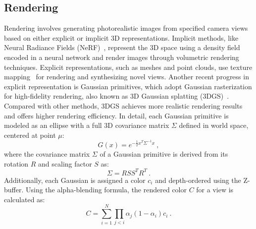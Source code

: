 \subsection{Rendering}
Rendering involves generating photorealistic images from specified camera views based on either explicit or implicit 3D representations. 
Implicit methods, like Neural Radiance Fields (NeRF)~\citep{mildenhall2021nerf}, represent the 3D space using a density field encoded in a neural network and render images through volumetric rendering techniques. 
Explicit representations, such as meshes and point clouds, use texture mapping~\cite{Blinn1976Texture} for rendering and synthesizing novel views. Another recent progress in explicit representation is Gaussian primitives, which adopt Gaussian rasterization for high-fidelity rendering, also known as 3D Gaussian splatting (3DGS)~\citep{kerbl3Dgaussians}.
Compared with other methods, 3DGS achieves more realistic rendering results and offers higher rendering efficiency.
In detail, each Gaussian primitive is modeled as an ellipse with a full 3D covariance matrix $\Sigma$ defined in world space, centered at point $\mu$:
\begin{equation*}
    G(x) = e^{-\frac{1}{2} x^T \Sigma^{-1} x}~,
\end{equation*}
where the covariance matrix $\Sigma$ of a Gaussian primitive is derived from its rotation $R$ and scaling factor $S$ as:
\begin{equation*}
    \Sigma = R S S^T R^T~.
\end{equation*}
Additionally, each Gaussian is assigned a color \( c_i \) and depth-ordered using the Z-buffer. Using the alpha-blending formula, the rendered color \( C \) for a view is calculated as:
\begin{equation*}
    C = \sum_{i=1}^N \prod_{j<i} \alpha_j (1 - \alpha_i) c_i~.
\end{equation*}



